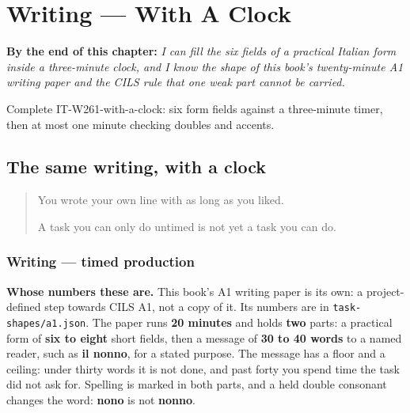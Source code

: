 
\chapter{Writing --- With A Clock}
\label{ch:it-with-a-clock}

\begin{chapteropening}
\textbf{By the end of this chapter:} \emph{I can fill the six fields of a practical Italian form inside a three-minute clock, and I know the shape of this book's twenty-minute A1 writing paper and the CILS rule that one weak part cannot be carried.}

Complete IT-W261-with-a-clock: six form fields against a three-minute timer, then at most one minute checking doubles and accents.
\end{chapteropening}

\section[(with a clock)]{The same writing, with a clock}

\label{lesson:IT-W261-with-a-clock}



\begin{quote}
You wrote your own line with as long as you liked.

A task you can only do untimed is not yet a task you can do.
\end{quote}

\subsection*{Writing — timed production}
\textbf{Whose numbers these are.} This book's A1 writing paper is its own: a project-defined step towards CILS A1, not a copy of it. Its numbers are in \texttt{task-shapes/a1.json}. The paper runs \textbf{20 minutes} and holds \textbf{two} parts: a practical form of \textbf{six to eight} short fields, then a message of \textbf{30 to 40 words} to a named reader, such as \textbf{il nonno}, for a stated purpose. The message has a floor and a ceiling: under thirty words it is not done, and past forty you spend time the task did not ask for. Spelling is marked in both parts, and a held double consonant changes the word: \textbf{nono} is not \textbf{nonno}.

